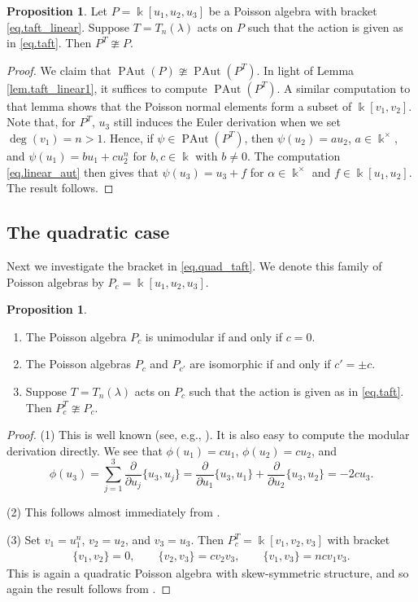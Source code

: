 \documentclass[reqno]{amsart}
\numberwithin{equation}{section}
\theoremstyle{definition}
\newtheorem{proposition}[theorem]{Proposition}
\DeclareMathOperator\PAut{PAut}
\newcommand\niso{\ncong}
\newcommand\kk{\Bbbk}
\begin{document}
\begin{proposition}\label{prop.taft_linear1}
Let $P=\kk[u_1,u_2,u_3]$ be a Poisson algebra with bracket \eqref{eq.taft_linear}. Suppose $T=T_n(\lambda)$ acts on $P$ such that the action is given as in \eqref{eq.taft}. Then $P^T \niso P$.
\end{proposition}
\begin{proof}
We claim that $\PAut(P) \niso \PAut(P^T)$. In light of Lemma \ref{lem.taft_linear1}, it suffices to compute $\PAut(P^T)$.
A similar computation to that lemma shows that the Poisson normal elements form a subset of $\kk[v_1,v_2]$. Note that, for $P^T$, $u_3$ still induces the Euler derivation when we set $\deg(v_1)=n>1$. Hence, if $\psi \in \PAut(P^T)$, then $\psi(u_2)=a u_2$, $a \in \kk^\times$, and $\psi(u_1)=bu_1+ cu_2^n$ for $b,c \in \kk$ with $b \neq 0$. The computation \eqref{eq.linear_aut} then gives that $\psi(u_3)=u_3 + f$ for $\alpha \in \kk^\times$ and $f \in \kk[u_1,u_2]$. The result follows.
\end{proof}



\subsection{The quadratic case}
Next we investigate the bracket in \eqref{eq.quad_taft}. We denote this family of Poisson algebras by
$P_c = \kk[u_1,u_2,u_3]$.

\begin{proposition}
\begin{enumerate}
    \item The Poisson algebra $P_c$ is unimodular if and only if $c=0$.
    \item The Poisson algebras $P_c$ and $P_{c'}$ are isomorphic if and only if $c'=\pm c$.
    \item Suppose $T=T_n(\lambda)$ acts on $P_c$ such that the action is given as in \eqref{eq.taft}. Then $P_c^T \niso P_c$.
\end{enumerate}
\end{proposition}
\begin{proof}
(1) This is well known (see, e.g., \cite[Theorem 3.1]{CGWZ4}). It is also easy to compute the modular derivation directly. We see that $\phi(u_1)=c u_1$, $\phi(u_2)=c u_2$, and 
\[
\phi(u_3) = \sum_{j=1}^3 \frac{\partial}{\partial u_j} \{u_3,u_j\}
    = \frac{\partial}{\partial u_1} \{u_3,u_1\} + \frac{\partial}{\partial u_2} \{u_3,u_2\} = -2c u_3.
\]

(2) This follows almost immediately from \cite[Theorem 4.6]{GXW}.

(3) Set $v_1=u_1^n$, $v_2 = u_2$, and $v_3 = u_3$. Then $P_c^T = \kk[v_1,v_2,v_3]$ with bracket 
\begin{align}\label{eq.Ac_rels}
    \{ v_1,v_2 \} = 0, \qquad 
    \{ v_2, v_3 \} = cv_2v_3, \qquad 
    \{ v_1,v_3 \} = n c v_1v_3.
\end{align}
This is again a quadratic Poisson algebra with skew-symmetric structure, and so again the result follows from \cite[Theorem 4.6]{GXW}.
\end{proof}
\end{document}
